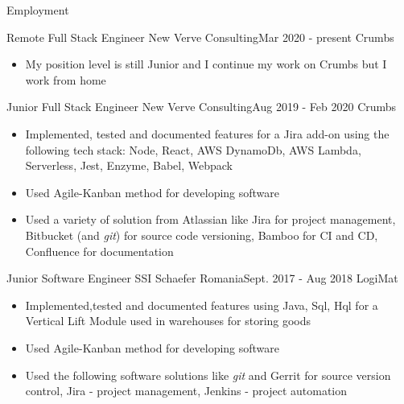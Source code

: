 \documentclass[]{mcdowellcv}
\begin{document}
	\makeheader
  
  \begin{cvsection}{Employment}

    \begin{cvsubsection}{Remote Full Stack Engineer }{New Verve Consulting}{Mar 2020 - present}
      Crumbs
			\begin{itemize}
				\item My position level is still Junior and I continue my work on Crumbs but I work from home
      \end{itemize}
    \end{cvsubsection}
    
		\begin{cvsubsection}{Junior Full Stack Engineer }{New Verve Consulting}{Aug 2019 - Feb 2020}
      Crumbs
			\begin{itemize}
				\item Implemented, tested and documented features for a Jira add-on using the following tech stack: Node, React, AWS DynamoDb, AWS Lambda, Serverless, Jest, Enzyme, Babel, Webpack
				\item Used Agile-Kanban method for developing software
				\item Used a variety of solution from Atlassian like Jira for project management, Bitbucket (and \textit{git}) for source code versioning, Bamboo for  CI and CD, Confluence for documentation
      \end{itemize}
		\end{cvsubsection}
    
		\begin{cvsubsection}{Junior Software Engineer }{SSI Schaefer Romania}{Sept. 2017 - Aug 2018}
			LogiMat
			\begin{itemize}
				\item Implemented,tested and documented features using Java, Sql, Hql for a Vertical Lift Module used in warehouses for storing goods
				\item Used Agile-Kanban method for developing software
				\item Used the following software solutions like \textit{git} and Gerrit for source version control, Jira - project management, \linebreak 
						Jenkins - project automation 
			\end{itemize}
		\end{cvsubsection}
		
  \end{cvsection}
  
\end{document}
